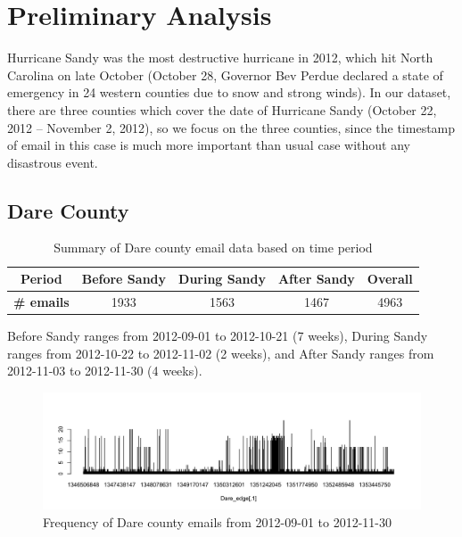 \documentclass[a4paper]{article}
\begin{document}
\section{Preliminary Analysis}
Hurricane Sandy was the most destructive hurricane in 2012, which hit North Carolina on late October (October 28, Governor Bev Perdue declared a state of emergency in 24 western counties due to snow and strong winds). In our dataset, there are three counties which cover the date of Hurricane Sandy (October 22, 2012 – November 2, 2012), so we focus on the three counties, since the timestamp of email in this case is much more important than usual case without any disastrous event.
\subsection{Dare County}
\footnotesize
\begin{table}[ht]
	\centering
	\begin{tabular}{ |c|ccc|c| } 
		\hline 
		\textbf{Period} &\textbf{Before Sandy} & \textbf{During Sandy} & \textbf{After Sandy} & \textbf{Overall} \\ 	\hline
			\textbf{\# emails}& 1933 & 1563 & 1467 & 4963 \\ 
		\hline
	\end{tabular}
	\caption{ Summary of Dare county email data based on time period}
	\label{table:nullDare2}
\end{table}
\normalsize
Before Sandy ranges from 2012-09-01 to 2012-10-21 (7 weeks), During Sandy ranges from 2012-10-22 to 2012-11-02 (2 weeks), and After Sandy ranges from 2012-11-03 to 2012-11-30 (4 weeks).
\footnotesize
\begin{figure}[ht]
	\centering
	\includegraphics[width=1.1\textwidth]{DareEmails.pdf} 
	\caption{Frequency of Dare county emails from 2012-09-01 to 2012-11-30  }
	\label{fig:Emailplots}
\end{figure}
\end{document}
